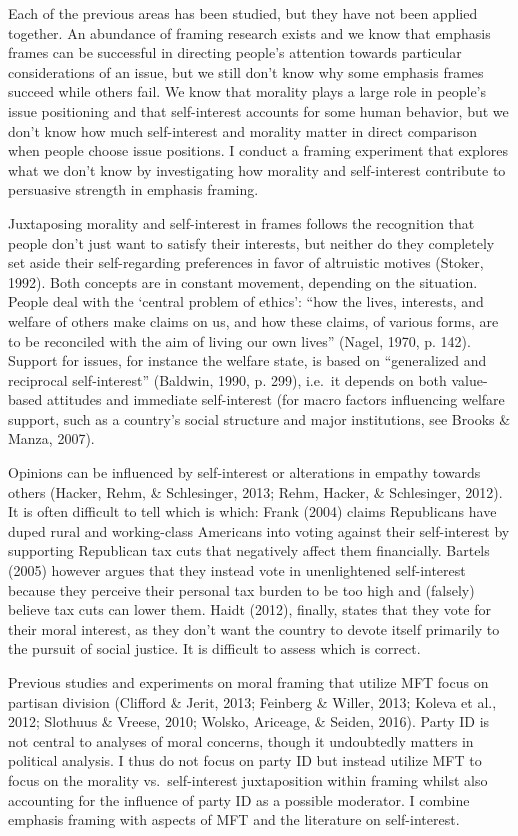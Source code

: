\documentclass[12pt,econ]{sources/authesis}
\begin{document}
Each of the previous areas has been studied, but they have not been applied together. An abundance of framing research exists and we know that emphasis frames can be successful in directing people's attention towards particular considerations of an issue, but we still don't know why some emphasis frames succeed while others fail. We know that morality plays a large role in people's issue positioning and that self-interest accounts for some human behavior, but we don't know how much self-interest and morality matter in direct comparison when people choose issue positions. I conduct a framing experiment that explores what we don't know by investigating how morality and self-interest contribute to persuasive strength in emphasis framing.

Juxtaposing morality and self-interest in frames follows the recognition that people don't just want to satisfy their interests, but neither do they completely set aside their self-regarding preferences in favor of altruistic motives (Stoker, 1992). Both concepts are in constant movement, depending on the situation. People deal with the `central problem of ethics': ``how the lives, interests, and welfare of others make claims on us, and how these claims, of various forms, are to be reconciled with the aim of living our own lives'' (Nagel, 1970, p. 142). Support for issues, for instance the welfare state, is based on ``generalized and reciprocal self-interest'' (Baldwin, 1990, p. 299), i.e.~it depends on both value-based attitudes and immediate self-interest (for macro factors influencing welfare support, such as a country's social structure and major institutions, see Brooks \& Manza, 2007).

Opinions can be influenced by self-interest or alterations in empathy towards others (Hacker, Rehm, \& Schlesinger, 2013; Rehm, Hacker, \& Schlesinger, 2012). It is often difficult to tell which is which: Frank (2004) claims Republicans have duped rural and working-class Americans into voting against their self-interest by supporting Republican tax cuts that negatively affect them financially. Bartels (2005) however argues that they instead vote in unenlightened self-interest because they perceive their personal tax burden to be too high and (falsely) believe tax cuts can lower them. Haidt (2012), finally, states that they vote for their moral interest, as they don't want the country to devote itself primarily to the pursuit of social justice. It is difficult to assess which is correct.

Previous studies and experiments on moral framing that utilize MFT focus on partisan division (Clifford \& Jerit, 2013; Feinberg \& Willer, 2013; Koleva et al., 2012; Slothuus \& Vreese, 2010; Wolsko, Ariceage, \& Seiden, 2016). Party ID is not central to analyses of moral concerns, though it undoubtedly matters in political analysis. I thus do not focus on party ID but instead utilize MFT to focus on the morality vs.~self-interest juxtaposition within framing whilst also accounting for the influence of party ID as a possible moderator. I combine emphasis framing with aspects of MFT and the literature on self-interest.
\end{document}
